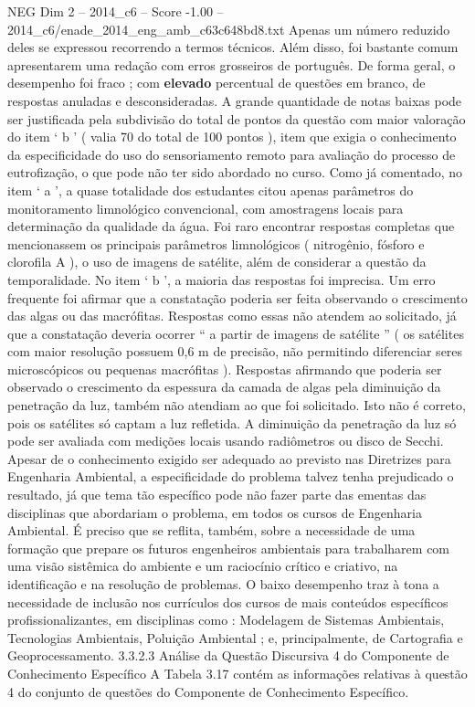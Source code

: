 \begin{textsample}{NEG Dim 2 – 2014\_c6 – Score -1.00 – 2014\_c6/enade\_2014\_eng\_amb\_c63c648bd8.txt}
Apenas um número reduzido deles se expressou recorrendo a termos técnicos.
Além disso, foi bastante comum apresentarem uma redação com erros grosseiros de português.
De forma geral, o desempenho foi fraco ; com \textbf{elevado} percentual de questões em branco, de respostas anuladas e desconsideradas.
A grande quantidade de notas baixas pode ser justificada pela subdivisão do total de pontos da questão com maior valoração do item ‘ b ’ ( valia 70 do total de 100 pontos ), item que exigia o conhecimento da especificidade do uso do sensoriamento remoto para avaliação do processo de eutrofização, o que pode não ter sido abordado no curso.
Como já comentado, no item ‘ a ’, a quase totalidade dos estudantes citou apenas parâmetros do monitoramento limnológico convencional, com amostragens locais para determinação da qualidade da água.
Foi raro encontrar respostas completas que mencionassem os principais parâmetros limnológicos ( nitrogênio, fósforo e clorofila A ), o uso de imagens de satélite, além de considerar a questão da temporalidade.
No item ‘ b ’, a maioria das respostas foi imprecisa.
Um erro frequente foi afirmar que a constatação poderia ser feita observando o crescimento das algas ou das macrófitas.
Respostas como essas não atendem ao solicitado, já que a constatação deveria ocorrer “ a partir de imagens de satélite ” ( os satélites com maior resolução possuem 0,6 m de precisão, não permitindo diferenciar seres microscópicos ou pequenas macrófitas ).
Respostas afirmando que poderia ser observado o crescimento da espessura da camada de algas pela diminuição da penetração da luz, também não atendiam ao que foi solicitado.
Isto não é correto, pois os satélites só captam a luz refletida.
A diminuição da penetração da luz só pode ser avaliada com medições locais usando radiômetros ou disco de Secchi.
Apesar de o conhecimento exigido ser adequado ao previsto nas Diretrizes para Engenharia Ambiental, a especificidade do problema talvez tenha prejudicado o resultado, já que tema tão específico pode não fazer parte das ementas das disciplinas que abordariam o problema, em todos os cursos de Engenharia Ambiental.
É preciso que se reflita, também, sobre a necessidade de uma formação que prepare os futuros engenheiros ambientais para trabalharem com uma visão sistêmica do ambiente e um raciocínio crítico e criativo, na identificação e na resolução de problemas.
O baixo desempenho traz à tona a necessidade de inclusão nos currículos dos cursos de mais conteúdos específicos profissionalizantes, em disciplinas como : Modelagem de Sistemas Ambientais, Tecnologias Ambientais, Poluição Ambiental ; e, principalmente, de Cartografia e Geoprocessamento. 3.3.2.3 Análise da Questão Discursiva 4 do Componente de Conhecimento Específico A Tabela 3.17 contém as informações relativas à questão 4 do conjunto de questões do Componente de Conhecimento Específico.

\end{textsample}
